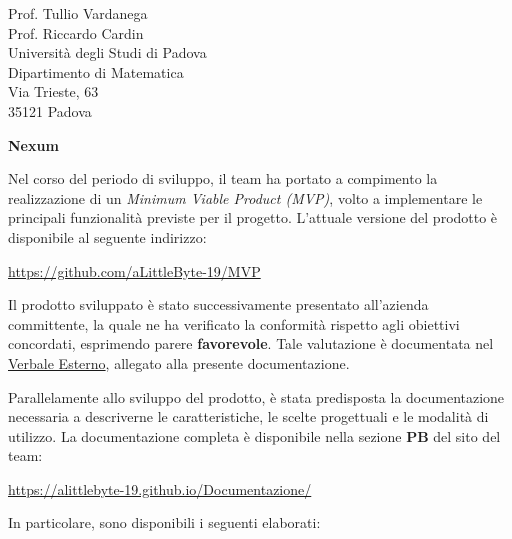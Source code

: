 \documentclass[a4paper,11pt]{letter}
\begin{document}
\begin{letter}{Prof. Tullio Vardanega\\Prof. Riccardo Cardin\\Università degli Studi di Padova\\Dipartimento di Matematica\\Via Trieste, 63\\35121 Padova}
  \begin{center}
      \textbf{Nexum}
  \end{center}

  Nel corso del periodo di sviluppo, il team ha portato a compimento la realizzazione di un \textit{Minimum Viable Product (MVP)}, volto a implementare le principali funzionalità previste per il progetto. L'attuale versione del prodotto è disponibile al seguente indirizzo: 
  
  \begin{center} 
      \url{https://github.com/aLittleByte-19/MVP} 
  \end{center} 
  
  Il prodotto sviluppato è stato successivamente presentato all'azienda committente, la quale ne ha verificato la conformità rispetto agli obiettivi concordati, esprimendo parere \textbf{favorevole}. Tale valutazione è documentata nel \href{https://alittlebyte-19.github.io/Documentazione/PB/Verbali/Verbali%20Esterni/Verbale_Esterno_2026_09_03_FIRMATO.html}{Verbale Esterno}, allegato alla presente documentazione.
  
  Parallelamente allo sviluppo del prodotto, è stata predisposta la documentazione necessaria a descriverne le caratteristiche, le scelte progettuali e le modalità di utilizzo. La documentazione completa è disponibile nella sezione \textbf{PB} del sito del team: 
  
  \begin{center} 
      \url{https://alittlebyte-19.github.io/Documentazione/} 
  \end{center} 

  \newpage
  In particolare, sono disponibili i seguenti elaborati: 

  \vspace{0.3em}


\end{letter}
\end{document}
